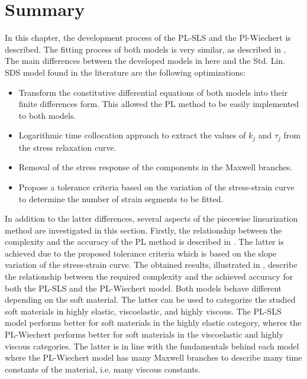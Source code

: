\section{Summary}

In this chapter, the development process of the PL-SLS and the Pl-Wiechert is described. The fitting process of both models is very similar, as described in . The main differences between the developed models in here and the Std. Lin. SDS model found in the literature \cite{austin2015control} are the following optimizations: 

\begin{itemize}
	\item Transform the constitutive differential equations of both models into their finite differences form. This allowed the PL method to be easily implemented to both models.
	\item Logarithmic time collocation approach to extract the values of $k_j$ and $\tau_j$ from the stress relaxation curve.
	\item Removal of the stress response of the components in the Maxwell branches.
	\item Propose a tolerance criteria based on the variation of the stress-strain curve to determine the number of strain segments to be fitted.
\end{itemize}

In addition to the latter differences, several aspects of the piecewise linearization method are investigated in this section. Firstly, the relationship between the complexity and the accuracy of the PL method is described in . The latter is achieved due to the proposed tolerance criteria which is based on the slope variation of the stress-strain curve. The obtained results, illustrated in , describe the relationship between the required complexity and the achieved accuracy for both the PL-SLS and the PL-Wiechert model. Both models behave different depending on the soft material. The latter can be used to categorize the studied soft materials in highly elastic, viscoelastic, and highly viscous. The PL-SLS model performs better for soft materials in the highly elastic category, wheres the PL-Wiechert performs better for soft materials in the viscoelastic and highly viscous categories. The latter is in line with the fundamentals behind each model where the PL-Wiechert model has many Maxwell branches to describe many time constants of the material, i.e. many viscous constants. 

